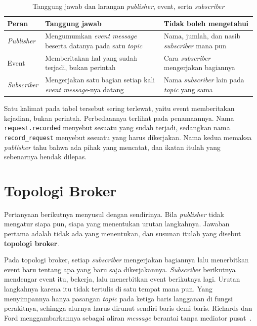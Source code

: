 \begin{table}[htbp]
  \centering
  \caption{Tanggung jawab dan larangan \textit{publisher}, event, serta \textit{subscriber}}
  \label{tab:peran-event}
  \begin{tabularx}{\textwidth}{|l|X|X|}
    \hline
    \textbf{Peran} & \textbf{Tanggung jawab} & \textbf{Tidak boleh mengetahui} \\
    \hline
    \textit{Publisher} & Mengumumkan \textit{event message} beserta datanya pada satu \textit{topic} & Nama, jumlah, dan nasib \textit{subscriber} mana pun \\
    \hline
    Event & Memberitakan hal yang sudah terjadi, bukan perintah & Cara \textit{subscriber} mengerjakan bagiannya \\
    \hline
    \textit{Subscriber} & Mengerjakan satu bagian setiap kali \textit{event message}-nya datang & Nama \textit{subscriber} lain pada \textit{topic} yang sama \\
    \hline
  \end{tabularx}
\end{table}

Satu kalimat pada tabel tersebut sering terlewat, yaitu event memberitakan
kejadian, bukan perintah. Perbedaannya terlihat pada penamaannya. Nama
\texttt{request.recorded} menyebut sesuatu yang sudah terjadi, sedangkan nama
\texttt{record\_request} menyebut sesuatu yang harus dikerjakan. Nama kedua
memaksa \textit{publisher} tahu bahwa ada pihak yang mencatat, dan ikatan itulah yang
sebenarnya hendak dilepas.

\section{Topologi Broker}

Pertanyaan berikutnya menyusul dengan sendirinya. Bila \textit{publisher} tidak mengatur
siapa pun, siapa yang menentukan urutan langkahnya. Jawaban pertama adalah
tidak ada yang menentukan, dan susunan itulah yang disebut \textbf{topologi
broker}.

Pada topologi broker, setiap \textit{subscriber} mengerjakan bagiannya lalu menerbitkan
event baru tentang apa yang baru saja dikerjakannya. \textit{Subscriber} berikutnya
mendengar event itu, bekerja, lalu menerbitkan event berikutnya lagi. Urutan
langkahnya karena itu tidak tertulis di satu tempat mana pun. Yang menyimpannya
hanya pasangan \textit{topic} pada ketiga baris langganan di
fungsi perakitnya,
sehingga alurnya harus dirunut sendiri baris demi baris. Richards dan Ford
menggambarkannya sebagai
aliran \textit{message} berantai tanpa mediator pusat~\cite{richards2020fundamentals}.

